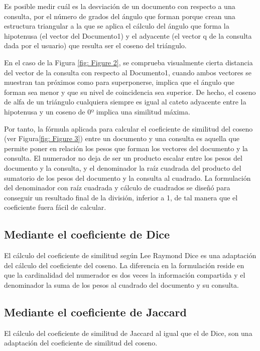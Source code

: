 \documentclass[titlepage]{article}
\begin{document}
	Es posible medir cuál es la desviación de un documento con respecto a una consulta, por el número de grados del ángulo que forman porque crean una estructura triangular a la que se aplica el cálculo del ángulo que forma la hipotenusa (el vector del Documento1) y el adyacente (el vector q de la consulta dada por el usuario) que resulta ser el coseno del triángulo. 
	
	En el caso de la Figura \ref{fig: Figure 2}, se comprueba visualmente cierta distancia del vector de la consulta con respecto al Documento1, cuando ambos vectores se muestran tan próximos como para superponerse, implica que el ángulo que forman sea menor y que su nivel de coincidencia sea superior. De hecho, el coseno de alfa de un triángulo cualquiera siempre es igual al cateto adyacente entre la hipotenusa y un coseno de 0º implica una similitud máxima.
	
	Por tanto, la fórmula aplicada para calcular el coeficiente de similitud del coseno (ver Figura\ref{fig: Figure 3}) entre un documento y una consulta es aquella que permite poner en relación los pesos que forman los vectores del documento y la consulta. El numerador no deja de ser un producto escalar entre los pesos del documento y la consulta, y el denominador la raíz cuadrada del producto del sumatorio de los pesos del documento y la consulta al cuadrado. La formulación del denominador con raíz cuadrada y cálculo de cuadrados se diseñó para conseguir un resultado final de la división, inferior a 1, de tal manera que el coeficiente fuera fácil de calcular.
	
	
	\subsection{Mediante el coeficiente de Dice}
	
	El cálculo del coeficiente de similitud según Lee Raymond Dice\cite{dice} es una adaptación del cálculo del coeficiente del coseno. La diferencia en la formulación reside en que la cardinalidad del numerador es dos veces la información compartida y el denominador la suma de los pesos al cuadrado del documento y su consulta. 
	
	
	\subsection{Mediante el coeficiente de Jaccard}
	
	El cálculo del coeficiente de similitud de Jaccard\cite{jaccard} al igual que el de Dice\cite{dice}, son una adaptación del coeficiente de similitud del coseno. 
	
\end{document}
